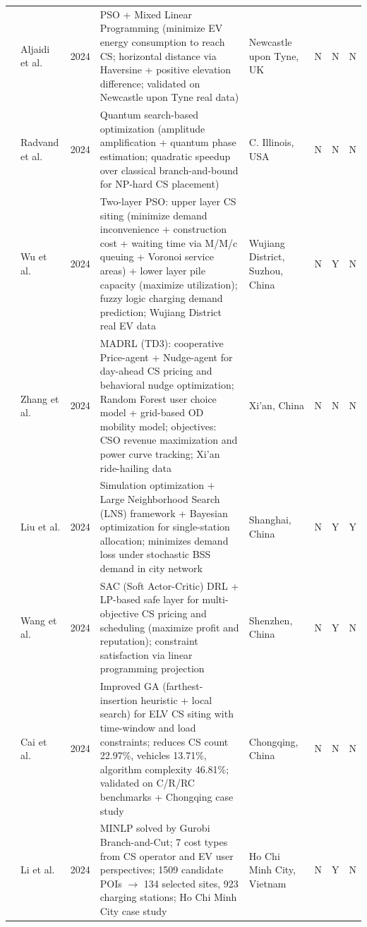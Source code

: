 \documentclass[letterpaper, 12pt, oneside, doublespacing]{Thesis}
\begin{document}
\begin{longtable}{L{0.9cm} L{1.8cm} L{0.7cm} L{2.5cm} L{2.1cm} L{0.7cm} L{0.7cm} L{0.7cm}}
\cite{a_particle_2024} & Aljaidi et al. & 2024 & PSO + Mixed Linear Programming (minimize EV energy consumption to reach CS; horizontal distance via Haversine + positive elevation difference; validated on Newcastle upon Tyne real data) & Newcastle upon Tyne, UK & N & N & N \\
\cite{a_quantum_2024} & Radvand et al. & 2024 & Quantum search-based optimization (amplitude amplification + quantum phase estimation; quadratic speedup over classical branch-and-bound for NP-hard CS placement) & C. Illinois, USA & N & N & N \\
\cite{a_two-layer_2024} & Wu et al. & 2024 & Two-layer PSO: upper layer CS siting (minimize demand inconvenience + construction cost + waiting time via M/M/c queuing + Voronoi service areas) + lower layer pile capacity (maximize utilization); fuzzy logic charging demand prediction; Wujiang District real EV data & Wujiang District, Suzhou, China & N & Y & N \\
\cite{advancing_urban_2024} & Zhang et al. & 2024 & MADRL (TD3): cooperative Price-agent + Nudge-agent for day-ahead CS pricing and behavioral nudge optimization; Random Forest user choice model + grid-based OD mobility model; objectives: CSO revenue maximization and power curve tracking; Xi'an ride-hailing data & Xi'an, China & N & N & N \\
\cite{battery_swapping_2024} & Liu et al. & 2024 & Simulation optimization + Large Neighborhood Search (LNS) framework + Bayesian optimization for single-station allocation; minimizes demand loss under stochastic BSS demand in city network & Shanghai, China & N & Y & Y \\
\cite{beyond_profit_2024} & Wang et al. & 2024 & SAC (Soft Actor-Critic) DRL + LP-based safe layer for multi-objective CS pricing and scheduling (maximize profit and reputation); constraint satisfaction via linear programming projection & Shenzhen, China & N & Y & N \\
\cite{charging_station_2024} & Cai et al. & 2024 & Improved GA (farthest-insertion heuristic + local search) for ELV CS siting with time-window and load constraints; reduces CS count 22.97\%, vehicles 13.71\%, algorithm complexity 46.81\%; validated on C/R/RC benchmarks + Chongqing case study & Chongqing, China & N & N & N \\
\cite{electric_vehicle_2024} & Li et al. & 2024 & MINLP solved by Gurobi Branch-and-Cut; 7 cost types from CS operator and EV user perspectives; 1509 candidate POIs $\rightarrow$ 134 selected sites, 923 charging stations; Ho Chi Minh City case study & Ho Chi Minh City, Vietnam & N & Y & N \\

\end{longtable}
\end{document}
